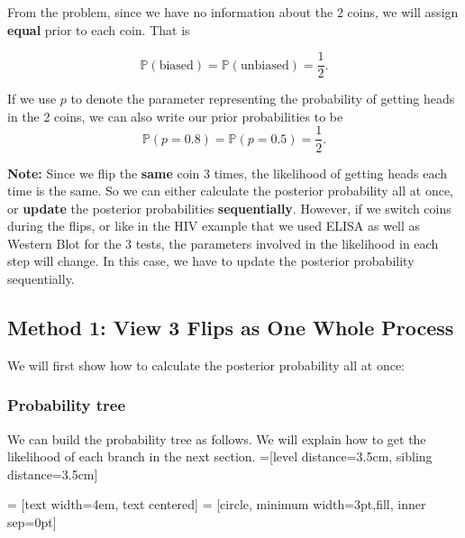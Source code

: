 \documentclass{article}
\begin{document}
From the problem, since we have no information about the 2 coins, we will assign \textbf{equal} prior to each coin. That is

$$ \mathbb{P}(\text{biased}) = \mathbb{P}(\text{unbiased}) = \frac{1}{2}. $$

If we use $p$ to denote the parameter representing the probability of getting heads in the 2 coins, we can also write our prior probabilities to be
$$ \mathbb{P}(p = 0.8) = \mathbb{P}(p = 0.5) = \frac{1}{2}. $$

\textbf{Note:} Since we flip the \textbf{same} coin 3 times, the likelihood of getting heads each time is the same. So we can either calculate the posterior probability all at once, or \textbf{update} the posterior probabilities \textbf{sequentially}. However, if we switch coins during the flips, or like in the HIV example that we used ELISA as well as Western Blot for the 3 tests, the parameters involved in the likelihood in each step will change. In this case, we have to update the posterior probability sequentially.

 
\subsection*{Method 1: View 3 Flips as One Whole Process}

We will first show how to calculate the posterior probability all at once:

\subsubsection*{Probability tree}

We can build the probability tree as follows. We will explain how to get the likelihood of each branch in the next section.
=[level distance=3.5cm, sibling distance=3.5cm]

 = [text width=4em, text centered]
 = [circle, minimum width=3pt,fill, inner sep=0pt]

\end{document}
